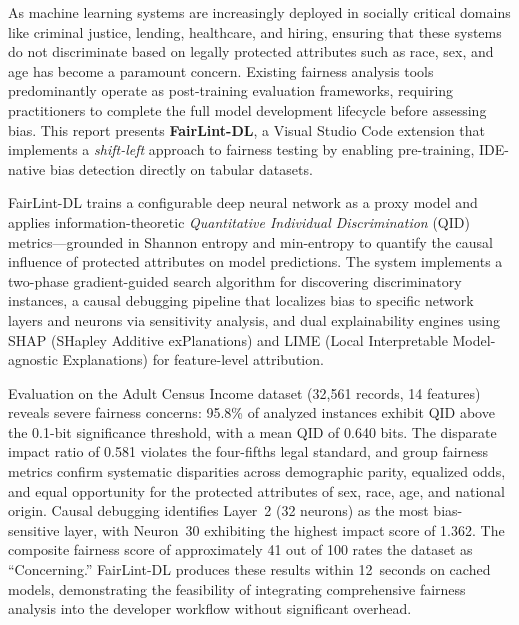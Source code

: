 As machine learning systems are increasingly deployed in socially critical domains like criminal justice, lending, healthcare, and hiring, ensuring that these systems do not discriminate based on legally protected attributes such as race, sex, and age has become a paramount concern. Existing fairness analysis tools predominantly operate as post-training evaluation frameworks, requiring practitioners to complete the full model development lifecycle before assessing bias. This report presents \textbf{FairLint-DL}, a Visual Studio Code extension that implements a \emph{shift-left} approach to fairness testing by enabling pre-training, IDE-native bias detection directly on tabular datasets.

FairLint-DL trains a configurable deep neural network as a proxy model and applies information-theoretic \emph{Quantitative Individual Discrimination} (QID) metrics---grounded in Shannon entropy and min-entropy to quantify the causal influence of protected attributes on model predictions. The system implements a two-phase gradient-guided search algorithm for discovering discriminatory instances, a causal debugging pipeline that localizes bias to specific network layers and neurons via sensitivity analysis, and dual explainability engines using SHAP (SHapley Additive exPlanations) and LIME (Local Interpretable Model-agnostic Explanations) for feature-level attribution.

Evaluation on the Adult Census Income dataset (32,561 records, 14 features) reveals severe fairness concerns: 95.8\% of analyzed instances exhibit QID above the 0.1-bit significance threshold, with a mean QID of 0.640 bits. The disparate impact ratio of 0.581 violates the four-fifths legal standard, and group fairness metrics confirm systematic disparities across demographic parity, equalized odds, and equal opportunity for the protected attributes of sex, race, age, and national origin. Causal debugging identifies Layer~2 (32 neurons) as the most bias-sensitive layer, with Neuron~30 exhibiting the highest impact score of 1.362. The composite fairness score of approximately 41 out of 100 rates the dataset as ``Concerning.'' FairLint-DL produces these results within 12~seconds on cached models, demonstrating the feasibility of integrating comprehensive fairness analysis into the developer workflow without significant overhead.
